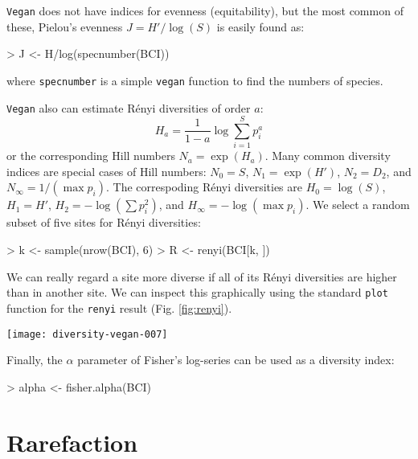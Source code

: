 \documentclass[a4paper,10pt]{amsart}
\begin{document}
\texttt{Vegan} does not have indices for evenness (equitability), but
the most common of these, Pielou's evenness $J = H'/\log(S)$ is easily
found as:
\begin{Schunk}
\begin{Sinput}
> J <- H/log(specnumber(BCI))
\end{Sinput}
\end{Schunk}
where \texttt{specnumber} is a simple \texttt{vegan} function to find
the numbers of species.

\texttt{Vegan} also can estimate R\'{e}nyi diversities of order $a$:
\begin{equation}
H_a = \frac{1}{1-a} \log \sum_{i=1}^S p_i^a
\end{equation}
or the corresponding Hill numbers $N_a = \exp(H_a)$.  Many common
diversity indices are special cases of Hill numbers: $N_0 = S$, $N_1 =
\exp(H')$, $N_2 = D_2$, and $N_\infty = 1/(\max p_i)$. The
correspoding R\'{e}nyi diversities are $H_0 = \log(S)$, $H_1 = H'$, $H_2 =
- \log(\sum p_i^2)$, and $H_\infty = - \log(\max p_i)$.  We select a
random subset of five sites for R\'{e}nyi diversities:
\begin{Schunk}
\begin{Sinput}
> k <- sample(nrow(BCI), 6)
> R <- renyi(BCI[k, ])
\end{Sinput}
\end{Schunk}
We can really regard a site more diverse if all of its R\'{e}nyi
diversities are higher than in another site.  We can inspect this
graphically using the standard \texttt{plot} function for the
\texttt{renyi} result (Fig. \ref{fig:renyi}).
\begin{SCfigure}
\texttt{[image: diversity-vegan-007]}
\caption{R\'{e}nyi diversities in six randomly selected plots. The plot
  uses Trellis graphics with a separate panel for each site. The dots
  show the values for sites, and the lines the extremes and median in
  the data set.}
\label{fig:renyi}
\end{SCfigure}

Finally, the $\alpha$ parameter of Fisher's log-series can be used as
a diversity index:
\begin{Schunk}
\begin{Sinput}
> alpha <- fisher.alpha(BCI)
\end{Sinput}
\end{Schunk}

\section{Rarefaction}
\end{document}

